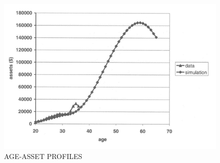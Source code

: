 \hypertarget{AgeAssetProfiles}{}
\begin{figure}[tbp]
  \centerline{\includegraphics[width=6in]{../FigDir/Figure5.png}}
  \caption{AGE-ASSET PROFILES}
  \label{fig:AgeAssetProfiles}
\end{figure}
